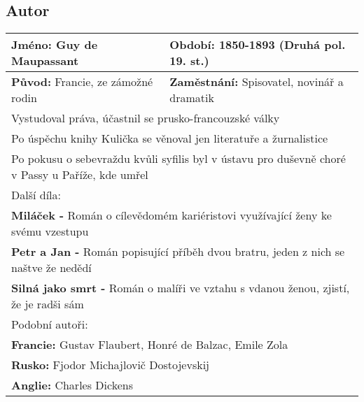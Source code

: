 \subsection*{Autor}
\begin{tabular}{l|l}
    \textbf{Jméno:} Guy de Maupassant         & \textbf{Období:} 1850-1893 (Druhá pol. 19. st.)                         \\
    \hline
    \textbf{Původ:} Francie, ze zámožné rodin & \textbf{Zaměstnání:} Spisovatel, novinář a dramatik                     \\
    \hline
    \multicolumn{2}{l}{Vystudoval práva, účastnil se prusko-francouzské války}                                          \\
    \multicolumn{2}{l}{Po úspěchu knihy Kulička se věnoval jen literatuře a žurnalistice}                               \\
    \multicolumn{2}{l}{Po pokusu o sebevraždu kvůli syfilis byl v ústavu pro duševně choré v Passy u Paříže, kde umřel} \\
    \hline
    \multicolumn{2}{l}{Další díla:}                                                                                     \\
    \multicolumn{2}{l}{\textbf{Miláček -} Román o cílevědomém kariéristovi využívající ženy ke svému vzestupu}          \\
    \multicolumn{2}{l}{\textbf{Petr a Jan -} Román popisující příběh dvou bratru, jeden z nich se naštve že nedědí}     \\
    \multicolumn{2}{l}{\textbf{Silná jako smrt -} Román o malíři ve vztahu s vdanou ženou, zjistí, že je radši sám}     \\
    \hline
    \multicolumn{2}{l}{Podobní autoři:}                                                                                 \\
    \multicolumn{2}{l}{\textbf{Francie:} Gustav Flaubert, Honré de Balzac, Emile Zola}                                  \\
    \multicolumn{2}{l}{\textbf{Rusko:} Fjodor Michajlovič Dostojevskij}                                                 \\
    \multicolumn{2}{l}{\textbf{Anglie:} Charles Dickens}                                                                \\
\end{tabular}